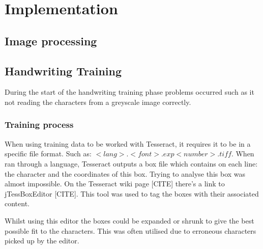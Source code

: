 \chapter{Implementation}




\section{Image processing}

\section{Handwriting Training}
During the start of the handwriting training phase problems occurred such as it not reading the characters from a greyscale image correctly.
\subsection{Training process}
When using training data to be worked with Tesseract, it requires it to be in a specific file format. Such as: $<lang>.<font>.exp<number>.tiff$. When ran through a language, Tesseract outputs a box file which contains on each line: the character and the coordinates of this box. Trying to analyse this box was almost impossible. On the Tesseract wiki page [CITE] there's a link to jTessBoxEditor [CITE]. This tool was used to tag the boxes with their associated content.

Whilst using this editor the boxes could be expanded or shrunk to give the best possible fit to the characters. This was often utilised due to erroneous characters picked up by the editor.

